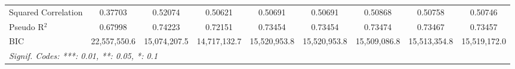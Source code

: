 \begin{table}[htbp]
\begin{tabular}{lcccccccc}
      Squared Correlation  & 0.37703         & 0.52074         & 0.50621         & 0.50691         & 0.50691         & 0.50868         & 0.50758         & 0.50746\\  
      Pseudo R$^2$         & 0.67998         & 0.74223         & 0.72151         & 0.73454         & 0.73454         & 0.73474         & 0.73467         & 0.73457\\  
      BIC                  & 22,557,550.6    & 15,074,207.5    & 14,717,132.7    & 15,520,953.8    & 15,520,953.8    & 15,509,086.8    & 15,513,354.8    & 15,519,172.0\\  
      \midrule \midrule
      \multicolumn{9}{l}{\emph{Signif. Codes: ***: 0.01, **: 0.05, *: 0.1}}\\
   \end{tabular}
\end{table}


